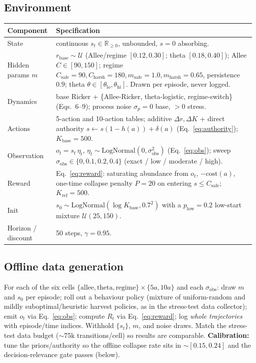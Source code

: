 \documentclass[11pt]{article}
\newcommand{\rbase}{r_{\mathrm{base}}}
\newcommand{\Kbase}{K_{\mathrm{base}}}
\newcommand{\Kref}{K_{\mathrm{ref}}}
\newcommand{\sobs}{\sigma_{\mathrm{obs}}}
\newcommand{\Csafe}{C_{\mathrm{safe}}}
\begin{document}
\subsection{Environment}
\begin{longtable}{@{}p{3.6cm}p{11.2cm}@{}}
\toprule
Component & Specification \\
\midrule
State & continuous $s_t\in\mathbb{R}_{\ge 0}$, unbounded, $s{=}0$ absorbing. \\
Hidden params $m$ & $\rbase\sim\mathcal{U}$ (Allee/regime $[0.12,0.30]$; theta $[0.18,0.40]$); Allee $C\in[90,150]$; regime $C_{\text{safe}}{=}90,C_{\text{harsh}}{=}180,m_{\text{safe}}{=}1.0,m_{\text{harsh}}{=}0.65$, persistence $0.9$; theta $\theta\in[\theta_{\mathrm{lo}},\theta_{\mathrm{hi}}]$. Drawn per episode, never logged. \\
Dynamics & base Ricker + \{Allee-Ricker, theta-logistic, regime-switch\} (Eqs.~6--9); process noise $\sigma_p{=}0$ base, $>0$ stress. \\
Actions & 5-action and 10-action tables; additive $\Delta r,\Delta K$ + direct authority $s\leftarrow s(1-h(a))+\delta(a)$ (Eq.~\ref{eq:authority}); $\Kbase{=}500$. \\
Observation & $o_t=s_t\,\eta_t$, $\eta_t\sim\mathrm{LogNormal}(0,\sobs^2)$ (Eq.~\ref{eq:obs}); sweep $\sobs\in\{0,0.1,0.2,0.4\}$ (exact / low / moderate / high). \\
Reward & Eq.~\ref{eq:reward}: saturating abundance from $o_t$, $-\mathrm{cost}(a)$, one-time collapse penalty $P{=}20$ on entering $s\le\Csafe$; $\Kref{=}500$. \\
Init & $s_0\sim\mathrm{LogNormal}(\log\Kbase,0.7^2)$ with a $p_{\mathrm{low}}{=}0.2$ low-start mixture $\mathcal{U}(25,150)$. \\
Horizon / discount & 50 steps, $\gamma{=}0.95$. \\
\bottomrule
\end{longtable}

\subsection{Offline data generation}
For each of the six cells $\{\text{allee},\text{theta},\text{regime}\}\times\{5a,10a\}$
and each $\sobs$: draw $m$ and $s_0$ per episode; roll out a behaviour policy
(mixture of uniform-random and mildly suboptimal/heuristic harvest policies, as in
the stress-test data collector); emit $o_t$ via Eq.~\ref{eq:obs}; compute $R_t$ via
Eq.~\ref{eq:reward}; log \emph{whole trajectories} with episode/time indices.
Withhold $\{s_t\}$, $m$, and noise draws. Match the stress-test data budget
($\sim$75k transitions/cell) so results are comparable. \textbf{Calibration:} tune
the priors/authority so the offline collapse rate sits in $\sim[0.15,0.24]$ and the
decision-relevance gate passes (below).
\end{document}

